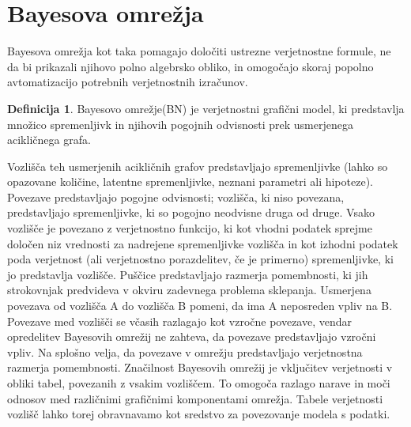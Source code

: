 \documentclass[12pt,a4paper]{amsart}
\theoremstyle{definition} %
\newtheorem{definicija}{Definicija}[section]
\theoremstyle{plain} %
\begin{document}
\section{Bayesova omrežja}
Bayesova omrežja kot taka pomagajo določiti ustrezne verjetnostne formule, ne da bi prikazali njihovo polno algebrsko obliko, in omogočajo
skoraj popolno avtomatizacijo potrebnih verjetnostnih izračunov.
\begin{definicija}
   Bayesovo omrežje(BN) je verjetnostni grafični model, ki predstavlja množico spremenljivk in njihovih pogojnih odvisnosti prek usmerjenega
   acikličnega grafa.
\end{definicija}
Vozlišča teh usmerjenih acikličnih grafov predstavljajo spremenljivke (lahko so opazovane količine, latentne spremenljivke, neznani parametri
ali hipoteze). Povezave predstavljajo pogojne odvisnosti; vozlišča, ki niso povezana, predstavljajo spremenljivke, ki so pogojno neodvisne
druga od druge. Vsako vozlišče je povezano z verjetnostno funkcijo, ki kot vhodni podatek sprejme določen niz vrednosti za nadrejene spremenljivke
vozlišča in kot izhodni podatek poda verjetnost (ali verjetnostno porazdelitev, če je primerno) spremenljivke, ki jo predstavlja vozlišče. Puščice
predstavljajo razmerja pomembnosti, ki jih strokovnjak predvideva v okviru zadevnega problema sklepanja. Usmerjena povezava od vozlišča A do
vozlišča B pomeni, da ima A neposreden vpliv na B. Povezave med vozlišči se včasih razlagajo kot vzročne povezave, vendar opredelitev Bayesovih
omrežij ne zahteva, da povezave predstavljajo vzročni vpliv. Na splošno velja, da povezave v omrežju predstavljajo verjetnostna razmerja
pomembnosti. Značilnost Bayesovih omrežij je vključitev verjetnosti v obliki tabel, povezanih z vsakim vozliščem. To omogoča razlago narave in
moči odnosov med različnimi grafičnimi komponentami omrežja. Tabele verjetnosti vozlišč lahko torej obravnavamo kot sredstvo za povezovanje
modela s podatki.

\end{document}
